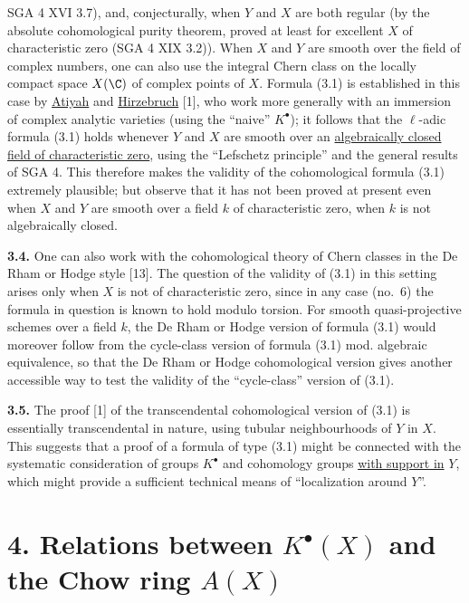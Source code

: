 %
SGA 4 XVI 3.7), and, conjecturally, when $Y$ and $X$ are both regular (by the absolute cohomological purity theorem, proved at least for excellent $X$ of characteristic zero (SGA 4 XIX 3.2)). When $X$ and $Y$ are smooth over the field of complex numbers, one can also use the integral Chern class on the locally compact space $X(\C)$ of complex points of $X$. Formula (3.1) is established in this case by \uline{Atiyah} and \uline{Hirzebruch} [1], who work more generally with an immersion of complex analytic varieties (using the ``naive'' $K^\bullet$); it follows that the $\ell$-adic formula (3.1) holds whenever $Y$ and $X$ are smooth over an \uline{algebraically closed field of characteristic zero}, using the ``Lefschetz principle'' and the general results of SGA 4. This therefore makes the validity of the cohomological formula (3.1) extremely plausible; but observe that it has not been proved at present even when $X$ and $Y$ are smooth over a field $k$ of characteristic zero, when $k$ is not algebraically closed.

\textbf{3.4.} One can also work with the cohomological theory of Chern classes in the De Rham or Hodge style [13]. The question of the validity of (3.1) in this setting arises only when $X$ is not of characteristic zero, since in any case (no.~6) the formula in question is known to hold modulo torsion. For smooth quasi-projective schemes over a field $k$, the De Rham or Hodge version of formula (3.1) would moreover follow from the cycle-class version of formula (3.1) mod. algebraic equivalence, so that the De Rham or Hodge cohomological version gives another accessible way to test the validity of the ``cycle-class'' version of (3.1).

\textbf{3.5.} The proof [1] of the transcendental cohomological version of (3.1) is essentially transcendental in nature, using tubular neighbourhoods of $Y$ in $X$. This suggests that a proof of a formula of type (3.1) might be connected with the systematic consideration of groups $K^\bullet$ and cohomology groups \uline{with support in} $Y$, which might provide a sufficient technical means of ``localization around $Y$''.

\section*{4. Relations between $K^\bullet(X)$ and the Chow ring $A(X)$}

